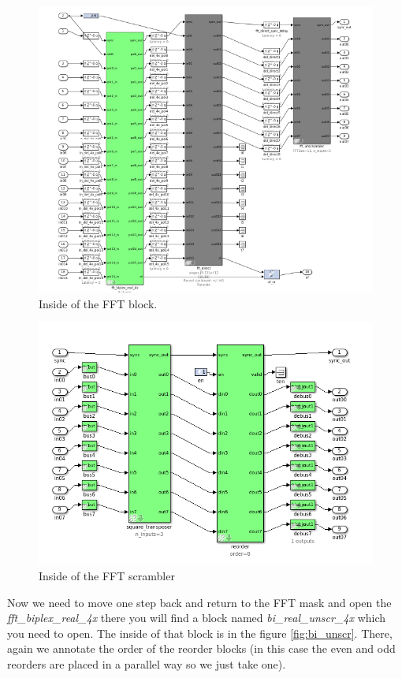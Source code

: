 \begin{figure}
    \centering
    \includegraphics[scale=0.4]{images/fft_inside.png}
    \caption{Inside of the FFT block.}
    \label{fig:fft_inside}
\end{figure}



\begin{figure}
    \centering
    \includegraphics[scale=0.4]{images/fft_scrambler.png}
    \caption{Inside of the FFT scrambler}
    \label{fig:fft_scrambler}
\end{figure}

Now we need to move one step back and return to the FFT mask  and open the \textit{fft\_biplex\_real\_4x} there you will find a block named \textit{bi\_real\_unscr\_4x} which you need to open. The inside of that block is in the figure \ref{fig:bi_unscr}. There, again we annotate the order of the reorder blocks (in this case the even and odd reorders are placed in a parallel way so we just take one).

